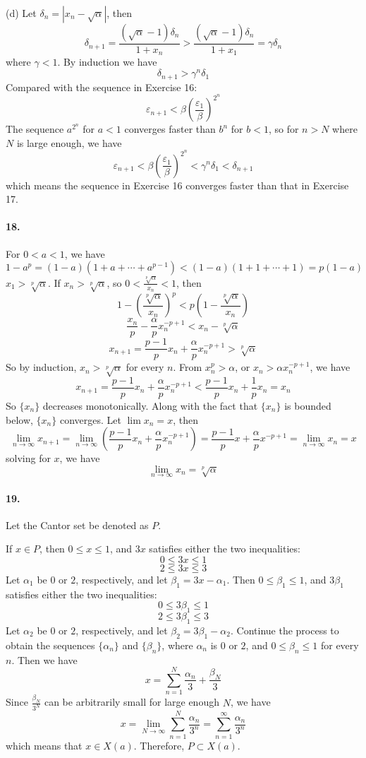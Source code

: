\documentclass[a4paper]{article}
\begin{document}
(d)
Let $\delta_n=|x_n-\sqrt{\alpha}|$, then 
\[
\delta_{n+1}=\frac{(\sqrt{\alpha}-1)\delta_n}{1+x_n}>\frac{(\sqrt{\alpha}-1)\delta_n}{1+x_1}=\gamma\delta_n
\]
where $\gamma<1$. By induction we have
\[
\delta_{n+1}>\gamma^n\delta_1
\]
Compared with the sequence in Exercise 16:
\[
\varepsilon_{n+1}<\beta\left(\frac{\varepsilon_1}{\beta} \right)^{2^n}
\]
The sequence $a^{2^n}$ for $a<1$ converges faster than $b^n$ for $b<1$, so for $n>N$ where $N$ is large enough, we have
\[
\varepsilon_{n+1}<\beta\left(\frac{\varepsilon_1}{\beta} \right)^{2^n}<\gamma^n\delta_1<\delta_{n+1}
\]
which means the sequence in Exercise 16 converges faster than that in Exercise 17.

\paragraph{18.}
For $0<a<1$, we have
\[
1-a^p=(1-a)(1+a+\cdots+a^{p-1})<(1-a)(1+1+\cdots+1)=p(1-a)
\]
$x_1>\sqrt[p]{\alpha}$. If $x_n>\sqrt[p]{\alpha}$, so $0<\frac{\sqrt[p]{\alpha}}{x_n}<1$, then 
\[
1-\left(\frac{\sqrt[p]{\alpha}}{x_n} \right)^p<p\left(1-\frac{\sqrt[p]{\alpha}}{x_n} \right)
\]
\[
\frac{x_n}{p}-\frac{\alpha}{p}x_n^{-p+1}<x_n-\sqrt[p]{\alpha}
\]
\[
x_{n+1}=\frac{p-1}{p}x_n+\frac{\alpha}{p}x_{n}^{-p+1}>\sqrt[p]{\alpha}
\]
So by induction, $x_n>\sqrt[p]{\alpha}$ for every $n$. From $x_n^p>\alpha$, or $x_n>\alpha x_n^{-p+1}$, we have
\[
x_{n+1}=\frac{p-1}{p}x_n+\frac{\alpha}{p}x_n^{-p+1}<\frac{p-1}{p}x_n+\frac{1}{p}x_n=x_n
\]
So $\{x_n\}$ decreases monotonically. Along with the fact that $\{x_n\}$ is bounded below, $\{x_n\}$ converges. Let $\lim x_n=x$, then 
\[
\lim_{n\to\infty}x_{n+1}=\lim_{n\to\infty}\left(\frac{p-1}{p}x_n+\frac{\alpha}{p}x_n^{-p+1} \right)=\frac{p-1}{p}x+\frac{\alpha}{p}x^{-p+1}=\lim_{n\to\infty}x_n=x
\]
solving for $x$, we have
\[
\lim_{n\to\infty}x_n=\sqrt[p]{\alpha}
\]

\paragraph{19.}
Let the Cantor set be denoted as $P$.

If $x\in P$, then $0\leq x\leq1$, and $3x$ satisfies either the two inequalities:
\[
0\leq 3x\leq 1
\]
\[
2\leq 3x\leq 3
\]
Let $\alpha_1$ be $0$ or $2$, respectively, and let $\beta_1=3x-\alpha_1$. Then $0\leq\beta_1\leq1$, and $3\beta_1$ satisfies either the two inequalities:
\[
0\leq3\beta_1\leq1
\]
\[
2\leq3\beta_1\leq3
\]
Let $\alpha_2$ be $0$ or $2$, respectively, and let $\beta_2=3\beta_1-\alpha_2$. Continue the process to obtain the sequences $\{\alpha_n\}$ and $\{\beta_n\}$, where $\alpha_n$ is $0$ or $2$, and $0\leq\beta_n\leq1$ for every $n$. Then we have
\[
x=\sum_{n=1}^N\frac{\alpha_n}{3}+\frac{\beta_N}{3}
\]
Since $\frac{\beta_N}{3^N}$ can be arbitrarily small for large enough $N$, we have
\[
x=\lim_{N\to\infty}\sum_{n=1}^N\frac{\alpha_n}{3^n}=\sum_{n=1}^\infty\frac{\alpha_n}{3^n}
\]
which means that $x\in X(a)$. Therefore, $P\subset X(a)$.
\medskip
\end{document}
